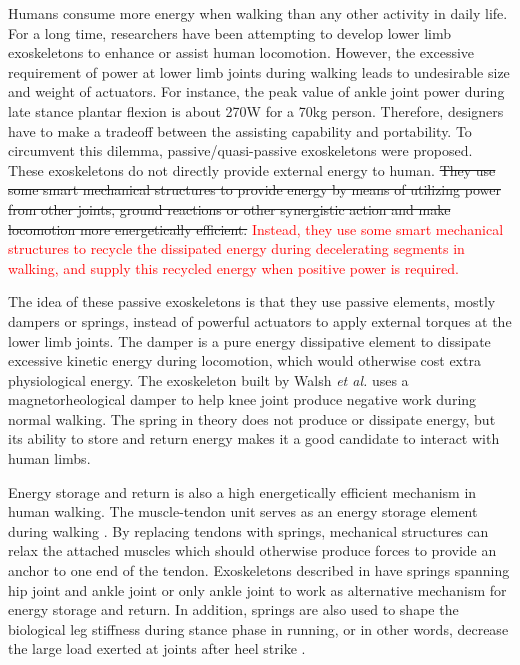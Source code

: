 \documentclass[twocolumn,cleanfoot,10pt]{asme2ej}
\begin{document}
Humans consume more energy when walking than any other activity in daily life. For a long time, researchers have been attempting to develop lower limb exoskeletons to enhance or assist human locomotion. However, the excessive requirement of power at lower limb joints during walking leads to undesirable size and weight of actuators\cite{RN1}. For instance, the peak value of ankle joint power during late stance plantar flexion is about 270W for a 70kg person\cite{RN2}. Therefore, designers have to make a tradeoff between the assisting capability and portability. To circumvent this dilemma, passive/quasi-passive exoskeletons were proposed\cite{RN3}. These exoskeletons do not directly provide external energy to human. \sout{They use some smart mechanical structures to provide energy by means of utilizing power from other joints, ground reactions or other synergistic action and make locomotion more energetically efficient.} \textcolor{red}{Instead, they use some smart mechanical structures to recycle the dissipated energy during decelerating segments in walking, and supply this recycled energy when positive power is required.}

The idea of these passive exoskeletons is that they use passive elements, mostly dampers or springs, instead of powerful actuators to apply external torques at the lower limb joints. The damper is a pure energy dissipative element to dissipate excessive kinetic energy during locomotion, which would otherwise cost extra physiological energy\cite{negativework}. The exoskeleton built by Walsh \emph{et al.} uses a magnetorheological damper to help knee joint produce negative work during normal walking\cite{RN3}. The spring in theory does not produce or dissipate energy, but its ability to store and return energy makes it a good candidate to interact with human limbs. 

Energy storage and return is also a high energetically efficient mechanism in human walking. The muscle-tendon unit serves as an energy storage element during walking \cite{RN16}\cite{pays}. By replacing tendons with springs, mechanical structures can relax the attached muscles which should otherwise produce forces to provide an anchor to one end of the tendon. Exoskeletons described in \cite{RN3}\cite{RN4}\cite{RN5} have springs spanning hip joint and ankle joint or only ankle joint to work as alternative mechanism for energy storage and return. In addition, springs are also used to shape the biological leg stiffness during stance phase in running, or in other words, decrease the large load exerted at joints after heel strike \cite{RN6,RN7,RN8}.
\end{document}
